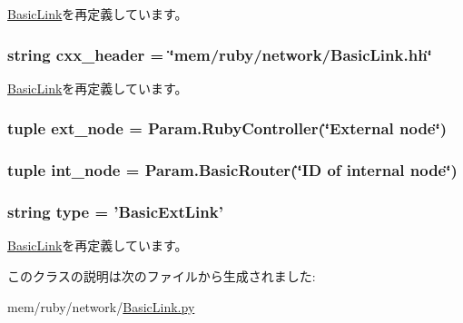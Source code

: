 \hyperlink{classBasicLink_1_1BasicLink_ac591437927b62e1825866e5357208d37}{BasicLink}を再定義しています。\hypertarget{classBasicLink_1_1BasicExtLink_a17da7064bc5c518791f0c891eff05fda}{
\subsubsection[{cxx\_\-header}]{\setlength{\rightskip}{0pt plus 5cm}string {\bf cxx\_\-header} = \char`\"{}mem/ruby/network/BasicLink.hh\char`\"{}}}
\label{classBasicLink_1_1BasicExtLink_a17da7064bc5c518791f0c891eff05fda}


\hyperlink{classBasicLink_1_1BasicLink_a17da7064bc5c518791f0c891eff05fda}{BasicLink}を再定義しています。\hypertarget{classBasicLink_1_1BasicExtLink_a84162bb9f01ed7cd5b41e306b611b5b0}{
\subsubsection[{ext\_\-node}]{\setlength{\rightskip}{0pt plus 5cm}tuple {\bf ext\_\-node} = Param.RubyController(\char`\"{}External node\char`\"{})}}
\label{classBasicLink_1_1BasicExtLink_a84162bb9f01ed7cd5b41e306b611b5b0}
\hypertarget{classBasicLink_1_1BasicExtLink_a9eeb322a8d27b584b2a08400f8d1b9d1}{
\subsubsection[{int\_\-node}]{\setlength{\rightskip}{0pt plus 5cm}tuple {\bf int\_\-node} = Param.BasicRouter(\char`\"{}ID of internal node\char`\"{})}}
\label{classBasicLink_1_1BasicExtLink_a9eeb322a8d27b584b2a08400f8d1b9d1}
\hypertarget{classBasicLink_1_1BasicExtLink_acce15679d830831b0bbe8ebc2a60b2ca}{
\subsubsection[{type}]{\setlength{\rightskip}{0pt plus 5cm}string {\bf type} = '{\bf BasicExtLink}'}}
\label{classBasicLink_1_1BasicExtLink_acce15679d830831b0bbe8ebc2a60b2ca}


\hyperlink{classBasicLink_1_1BasicLink_acce15679d830831b0bbe8ebc2a60b2ca}{BasicLink}を再定義しています。

このクラスの説明は次のファイルから生成されました:\begin{DoxyCompactItemize}
\item 
mem/ruby/network/\hyperlink{BasicLink_8py}{BasicLink.py}\end{DoxyCompactItemize}
